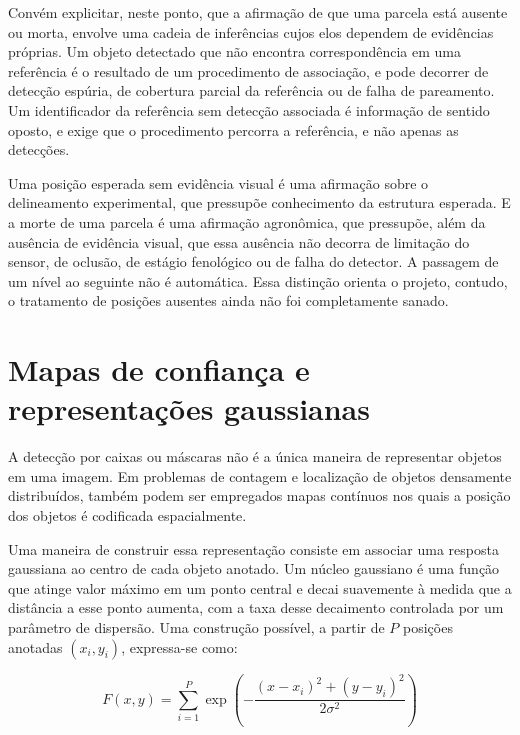 Conv\'em explicitar, neste ponto, que a afirma\c{c}\~ao de que uma parcela est\'a ausente ou morta, envolve uma cadeia de infer\^encias cujos elos dependem de evid\^encias pr\'oprias. Um objeto detectado que n\~ao encontra correspond\^encia em uma refer\^encia \'e o resultado de um procedimento de associa\c{c}\~ao, e pode decorrer de detec\c{c}\~ao esp\'uria, de cobertura parcial da refer\^encia ou de falha de pareamento. Um identificador da refer\^encia sem detec\c{c}\~ao associada \'e informa\c{c}\~ao de sentido oposto, e exige que o procedimento percorra a refer\^encia, e n\~ao apenas as detec\c{c}\~oes.

Uma posi\c{c}\~ao esperada sem evid\^encia visual \'e uma afirma\c{c}\~ao sobre o delineamento experimental, que pressup\~oe conhecimento da estrutura esperada. E a morte de uma parcela \'e uma afirma\c{c}\~ao agron\^omica, que pressup\~oe, al\'em da aus\^encia de evid\^encia visual, que essa aus\^encia n\~ao decorra de limita\c{c}\~ao do sensor, de oclus\~ao, de est\'agio fenol\'ogico ou de falha do detector. A passagem de um n\'ivel ao seguinte n\~ao \'e autom\'atica. Essa distin\c{c}\~ao orienta o projeto, contudo, o tratamento de posi\c{c}\~oes ausentes ainda n\~ao foi completamente sanado.

\section{Mapas de confian\c{c}a e representa\c{c}\~oes gaussianas}
\label{sec:mapas-confianca}

A detec\c{c}\~ao por caixas ou m\'ascaras n\~ao \'e a \'unica maneira de representar objetos em uma imagem. Em problemas de contagem e localiza\c{c}\~ao de objetos densamente distribu\'idos, tamb\'em podem ser empregados mapas cont\'inuos nos quais a posi\c{c}\~ao dos objetos \'e codificada espacialmente.

Uma maneira de construir essa representa\c{c}\~ao consiste em associar uma resposta gaussiana ao centro de cada objeto anotado. Um n\'ucleo gaussiano \'e uma fun\c{c}\~ao que atinge valor m\'aximo em um ponto central e decai suavemente \`a medida que a dist\^ancia a esse ponto aumenta, com a taxa desse decaimento controlada por um par\^ametro de dispers\~ao. Uma constru\c{c}\~ao poss\'ivel, a partir de $P$ posi\c{c}\~oes anotadas $(x_i, y_i)$, expressa-se como:

\begin{equation}
  F(x,y) = \sum_{i=1}^{P} \exp\left(-\frac{(x-x_i)^2 + (y-y_i)^2}{2\sigma^2}\right)
  \label{eq:mapa-confianca}
\end{equation}

